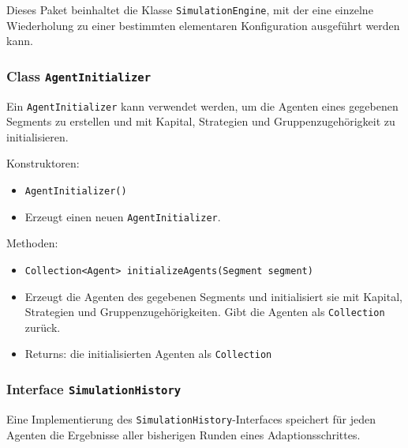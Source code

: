 \documentclass[parskip=full,11pt]{scrartcl}
\begin{document}
Dieses Paket beinhaltet die Klasse \texttt{SimulationEngine}, mit der eine einzelne Wiederholung zu einer bestimmten elementaren Konfiguration ausgeführt werden kann.

\subsubsection{Class \texttt{AgentInitializer}}
Ein \texttt{AgentInitializer} kann verwendet werden, um die Agenten eines gegebenen Segments zu erstellen und mit Kapital, Strategien und Gruppenzugehörigkeit zu initialisieren.

Konstruktoren:
\begin{itemize}\itemsep -10pt
\item \texttt{AgentInitializer()}
\item[] Erzeugt einen neuen \texttt{AgentInitializer}.
\end{itemize}

Methoden:
\begin{itemize}\itemsep -10pt
\item \texttt{Collection<Agent> initializeAgents(Segment segment)}
\item[] Erzeugt die Agenten des gegebenen Segments und initialisiert sie mit Kapital, Strategien und Gruppenzugehörigkeiten. Gibt die Agenten als \texttt{Collection} zurück.
\item[] Returns: die initialisierten Agenten als \texttt{Collection}
\end{itemize}

\subsubsection{Interface \texttt{SimulationHistory}}
Eine Implementierung des \texttt{SimulationHistory}-Interfaces speichert für jeden Agenten die Ergebnisse aller bisherigen Runden eines Adaptionsschrittes.
\end{document}
